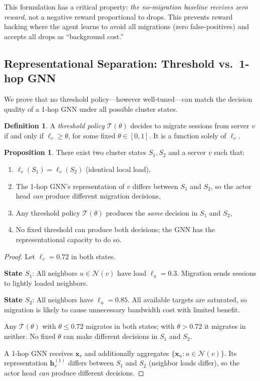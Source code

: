 \documentclass[review,1p]{elsarticle}
\theoremstyle{definition}
\newtheorem{definition}{Definition}
\newtheorem{proposition}{Proposition}
\begin{document}
This formulation has a critical property: \emph{the no-migration
baseline receives zero reward}, not a negative reward proportional to
drops.  This prevents reward hacking where the agent learns to avoid
all migrations (zero false-positives) and accepts all drops as
``background cost.''

\subsection{Representational Separation: Threshold vs.\ 1-hop GNN}
\label{sec:proposition}

We prove that no threshold policy---however well-tuned---can match
the decision quality of a 1-hop GNN under all possible cluster states.

\begin{definition}
A \emph{threshold policy} $\mathcal{T}(\theta)$ decides to migrate
sessions from server $v$ if and only if $\ell_v \geq \theta$, for some
fixed $\theta \in [0,1]$.  It is a function solely of $\ell_v$.
\end{definition}

\begin{proposition}
\label{prop:main}
There exist two cluster states $S_1, S_2$ and a server $v$ such that:
\begin{enumerate}
  \item $\ell_v(S_1) = \ell_v(S_2)$ (identical local load),
  \item The 1-hop GNN's representation of $v$ differs between $S_1$ and $S_2$,
        so the actor head \emph{can} produce different migration decisions,
  \item Any threshold policy $\mathcal{T}(\theta)$ produces the \emph{same}
        decision in $S_1$ and $S_2$,
  \item No fixed threshold can produce both decisions; the GNN has the
        representational capacity to do so.
\end{enumerate}
\end{proposition}

\begin{proof}
Let $\ell_v = 0.72$ in both states.

\textbf{State $S_1$}: All neighbors $u \in \mathcal{N}(v)$ have load
$\ell_u = 0.3$.  Migration sends sessions to lightly loaded neighbors.

\textbf{State $S_2$}: All neighbors have $\ell_u = 0.85$.
All available targets are saturated, so migration is likely to cause
unnecessary bandwidth cost with limited benefit.

Any $\mathcal{T}(\theta)$ with $\theta \leq 0.72$ migrates in both states;
with $\theta > 0.72$ it migrates in neither.
No fixed $\theta$ can make different decisions in $S_1$ and $S_2$.

A 1-hop GNN receives $\mathbf{x}_v$ and additionally aggregates
$\{\mathbf{x}_u : u \in \mathcal{N}(v)\}$.  Its representation
$\mathbf{h}_v^{(1)}$ differs between $S_1$ and $S_2$ (neighbor
loads differ), so the actor head \emph{can} produce different decisions.
\end{proof}
\end{document}
